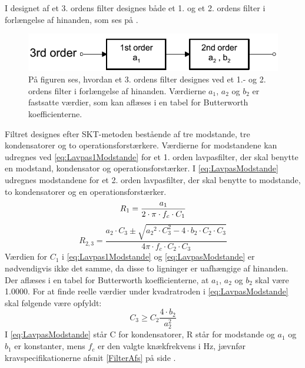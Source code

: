 I designet af et 3. ordens filter designes både et 1. og et 2. ordens filter i forlængelse af hinanden, som ses på .
\begin{figure}[H]
	\centering
	\includegraphics[scale=0.7]{figures/cProblemloesning/Filter_Orden.PNG}
	\caption{På figuren ses, hvordan et 3. ordens filter designes ved et 1.- og 2. ordens filter i forlængelse af hinanden. Værdierne $a_{1}$, $a_{2}$ og $b_{2}$ er fastsatte værdier, som kan aflæses i en tabel for Butterworth koefficienterne. \cite{Carter2013}}
	\label{fig:filter_Orden}
\end{figure}
\noindent Filtret designes efter SKT-metoden bestående af tre modstande, tre kondensatorer og to operationsforstærkere. Værdierne for modstandene kan udregnes ved \eqref{eq:Lavpas1Modstande} for et 1. orden lavpasfilter, der skal benytte en modstand, kondensator og operationsforstærker. I \eqref{eq:LavpasModstande} udregnes modstandene for et  2. orden lavpasfilter, der skal benytte to modstande, to kondensatorer og en operationsforstærker. \cite{Carter2013}
\begin{equation} \label{eq:Lavpas1Modstande}
R_{1} = \frac{a_1}{2 \cdot \pi \cdot f_c \cdot C_1} \\
\end{equation}
\begin{equation}
 \label{eq:LavpasModstande}
R_{2,3} = \frac{a_2 \cdot C_3 \pm \sqrt{{a_2}^2 \cdot C_3^2 - 4 \cdot b_2 \cdot C_2 \cdot C_3}}{4 \pi \cdot f_c \cdot C_2 \cdot C_3}
\end{equation}
\noindent Værdien for $C_{1}$ i \eqref{eq:Lavpas1Modstande} og \eqref{eq:LavpasModstande} er nødvendigvis ikke det samme, da disse to ligninger er uafhængige af hinanden. Der aflæses i en tabel for Butterworth koefficienterne, at $a_{1}$, $a_{2}$ og $b_{2}$ skal være 1.0000. For at finde reelle værdier under kvadratroden i \eqref{eq:LavpasModstande} skal følgende være opfyldt:
\begin{equation} \label{eq:kondensator}
C_3 \geq C_2 \frac{4 \cdot b_2}{a_2^2}
\end{equation}
I \eqref{eq:LavpasModstande} står C for kondensatorer, R står for modstande og $a_1$ og $b_1$ er konstanter, mens $f_c$ er den valgte knækfrekvens i Hz, jævnfør kravspecifikationerne afsnit \ref{FilterAfs} på side \pageref{FilterAfs}. 

